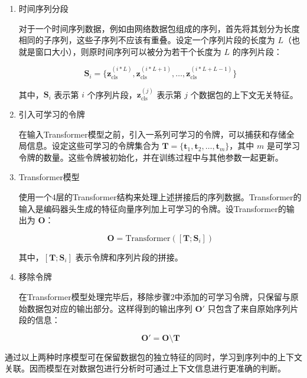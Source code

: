 \begin{enumerate}
\item 时间序列分段
   
   对于一个时间序列数据，例如由网络数据包组成的序列，首先将其划分为长度相同的子序列，这些子序列不应该有重叠。设定一个序列片段的长度为 $L$（也就是窗口大小），则原时间序列可以被分为若干个长度为 $L$ 的序列片段：

   \begin{equation}
          \mathbf{S}_i = \{\mathbf{z}_{\mathrm{cls}}^{(i*L)}, \mathbf{z}_{\mathrm{cls}}^{(i*L+1)}, \ldots, \mathbf{z}_{\mathrm{cls}}^{(i*L+L-1)}\}
   \end{equation}

   其中，$\mathbf{S}_i$ 表示第 $i$ 个序列片段，$\mathbf{z}_{\mathrm{cls}}^{(j)}$ 表示第 $j$ 个数据包的上下文无关特征。

\item 引入可学习的令牌

   在输入Transformer模型之前，引入一系列可学习的令牌，可以捕获和存储全局信息。设定这些可学习的令牌集合为 $\mathbf{T} = \{\mathbf{t}_1, \mathbf{t}_2, \ldots, \mathbf{t}_m\}$，其中 $m$ 是可学习令牌的数量。这些令牌被初始化，并在训练过程中与其他参数一起更新。

\item Transformer模型

   使用一个4层的Transformer结构来处理上述拼接后的序列数据。Transformer的输入是编码器头生成的特征向量序列加上可学习的令牌。设Transformer的输出为 $\mathbf{O}$：

   \begin{equation}
   \mathbf{O} = {\mathrm{Transformer}}([\mathbf{T}; \mathbf{S}_i])
   \end{equation}

   其中，$[\mathbf{T}; \mathbf{S}_i]$ 表示令牌和序列片段的拼接。

\item 移除令牌

   在Transformer模型处理完毕后，移除步骤2中添加的可学习令牌，只保留与原始数据包对应的输出部分。这样得到的输出序列 $\mathbf{O'}$ 只包含了来自原始序列片段的信息：

   \begin{equation}
   \mathbf{O'} = \mathbf{O} \setminus \mathbf{T}
   \end{equation}
\end{enumerate}

通过以上两种时序模型可在保留数据包的独立特征的同时，学习到序列中的上下文关联。因而模型在对数据包进行分析时可通过上下文信息进行更准确的判断。

